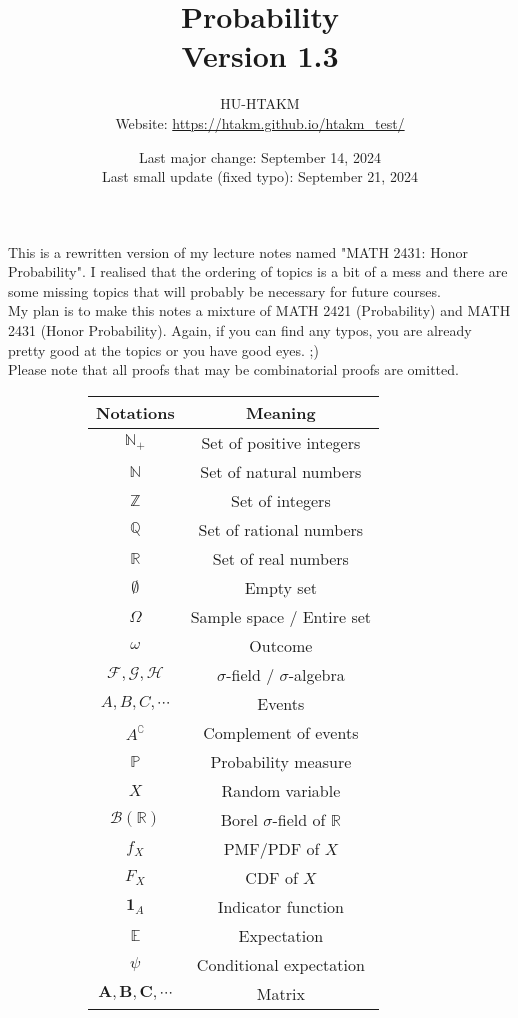 \documentclass{huhtakm-template-book}
\title{
	\Huge Probability\\
	\small Version 1.3
}
\author{
	HU-HTAKM\\
	\small Website: \url{https://htakm.github.io/htakm_test/}
}
\date{
	Last major change: September 14, 2024\\
	Last small update (fixed typo): September 21, 2024
}
\newcommand{\prob}{\mathbb{P}}
\begin{document}
\maketitle
This is a rewritten version of my lecture notes named "MATH 2431: Honor Probability". I realised that the ordering of topics is a bit of a mess and there are some missing topics that will probably be necessary for future courses.\\
My plan is to make this notes a mixture of MATH 2421 (Probability) and MATH 2431 (Honor Probability). Again, if you can find any typos, you are already pretty good at the topics or you have good eyes. ;)\\
Please note that all proofs that may be combinatorial proofs are omitted.
\begin{figure}[h]
	\begin{subfigure}{0.45\textwidth}
		\centering
		\begin{tabular}{cc}
			Notations & Meaning\\
			\hline
			$\mathbb{N}_{+}$ & Set of positive integers\\
			$\mathbb{N}$ & Set of natural numbers\\
			$\mathbb{Z}$ & Set of integers\\
			$\mathbb{Q}$ & Set of rational numbers\\
			$\mathbb{R}$ & Set of real numbers\\
			$\emptyset$ & Empty set\\
			$\Omega$ & Sample space / Entire set\\
			$\omega$ & Outcome\\
			$\mathcal{F},\mathcal{G},\mathcal{H}$ & $\sigma$-field / $\sigma$-algebra\\
			$A,B,C,\cdots$ & Events\\
			$A^{\complement}$ & Complement of events\\
			$\prob$ & Probability measure\\
			$X$ & Random variable\\
			$\mathcal{B}(\mathbb{R})$ & Borel $\sigma$-field of $\mathbb{R}$ \\
			$f_{X}$ & PMF/PDF of $X$\\
			$F_{X}$ & CDF of $X$\\
			$\mathbf{1}_{A}$ & Indicator function\\
			$\mathbb{E}$ & Expectation\\
			$\psi$ & Conditional expectation\\
			$\mathbf{A},\mathbf{B},\mathbf{C},\cdots$ & Matrix\\

\end{tabular}
\end{subfigure}
\end{figure}
\end{document}
